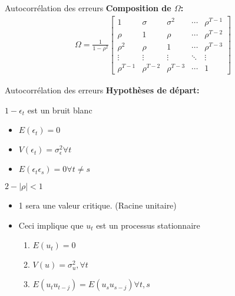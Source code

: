 \documentclass{beamer}
\begin{document}
\begin{frame}{Autocorrélation des erreurs}
\textbf{Composition de $\Omega$:}
\begin{align*}
\Omega = \frac{1}{1-\rho^2}\begin{bmatrix}
1 & \sigma & \sigma^2 & \cdots & \rho^{T-1}\\
\rho & 1 & \rho & \cdots & \rho^{T-2} \\
\rho^2 & \rho & 1 & \cdots & \rho^{T-3} \\
\vdots & \vdots & \vdots & \ddots & \vdots\\
\rho^{T-1} & \rho^{T-2} & \rho^{T-3} & \cdots & 1
\end{bmatrix}
\end{align*}
\end{frame}

\begin{frame}{Autocorrélation des erreurs}
\textbf{Hypothèses de départ:}
\begin{block}{$1-\epsilon_t$ est un bruit blanc}
\begin{itemize}
\item $E(\epsilon_t)=0$
\item $V(\epsilon_t)=\sigma_{\epsilon}^2 \forall t$
\item $E(\epsilon_t\epsilon_s)=0 \forall t \neq s$
\end{itemize}
\end{block}

\begin{block}{$2-\mid \rho \mid < 1$}
\begin{itemize}
\item 1 sera une valeur critique. (Racine unitaire)
\item Ceci implique que $u_t$ est un processus stationnaire
\begin{enumerate}
\item $E(u_t)=0$
\item $V(u)=\sigma_u^2, \forall t$
\item $E(u_tu_{t-j})=E(u_su_{s-j}) \forall t,s$
\end{enumerate}
\end{itemize}
\end{block}
\end{frame}
\end{document}
